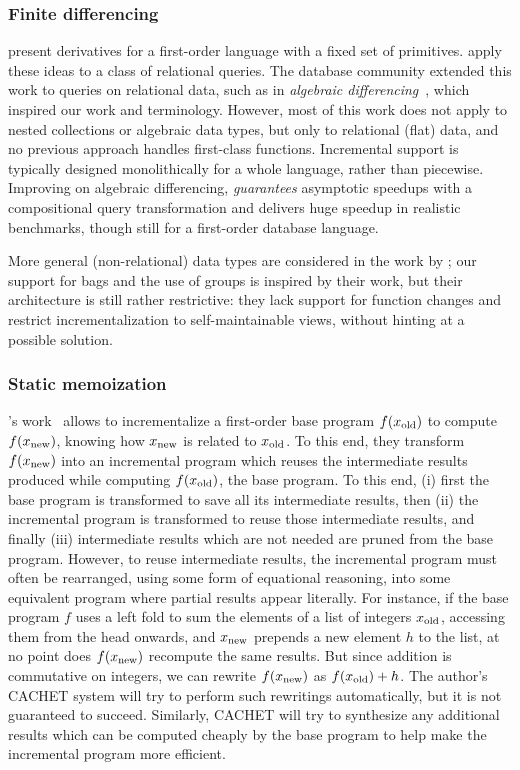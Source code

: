 \subsubsection{Finite differencing}
\label{sec:finite-diff}
\citet{Paige82FDC} present derivatives for a first-order language
with a fixed set of primitives.
\citet{Blakeley:1986:EUM} apply these ideas to a class of relational queries.
The database community extended
this work to queries on relational data, such as in \emph{algebraic
  differencing}~\citep{Gupta99MMV}, which inspired our work and
terminology. However, most of this work does not apply to nested
collections or algebraic data types, but only to relational
(flat) data, and no previous approach handles first-class
functions. Incremental support is typically designed
monolithically for a whole language, rather than piecewise.
Improving on algebraic differencing, \citet{Koch10IQE}
\emph{guarantees} asymptotic speedups with a compositional query
transformation and delivers huge speedup in realistic benchmarks,
though still for a first-order database language.

More general (non-relational) data types are considered in the work by \citet{GlucheGrust97Incr};
our support for bags and the use of groups is inspired by their work,
but their architecture is still rather restrictive: they lack
support for function changes and restrict incrementalization to
self-maintainable views, without hinting at a possible solution.

\subsubsection{Static memoization}
\label{ssec:staticmemo}
\citeauthor{Liu00}'s work~\citep{Liu00} allows to incrementalize a first-order base
program $f(x_{\textrm{old}})$ to compute $f(x_{\textrm{new}})$, knowing how
$x_{\textrm{new}}$ is related to $x_{\textrm{old}}$. To this end, they transform
$f(x_{\textrm{new}})$ into an incremental program which reuses the
intermediate results produced while computing $f(x_{\textrm{old}})$, the
base program. To this end, (i) first the base program is
transformed to save all its intermediate results, then (ii) the
incremental program is transformed to reuse those intermediate
results, and finally (iii) intermediate results which are not
needed are pruned from the base program. However, to reuse
intermediate results, the incremental program must often be
rearranged, using some form of equational reasoning, into some
equivalent program where partial results appear literally. For
instance, if the base program $f$ uses a left fold to sum the
elements of a list of integers $x_{\textrm{old}}$, accessing them from the
head onwards, and $x_{\textrm{new}}$ prepends a new element $h$ to the
list, at no point does $f(x_{\textrm{new}})$ recompute the same results.
But since addition is commutative on integers, we can rewrite
$f(x_{\textrm{new}})$ as $f(x_{\textrm{old}}) + h$. The author's CACHET system will
try to perform such rewritings automatically, but it is not
guaranteed to succeed. Similarly, CACHET will try to synthesize
any additional results which can be computed cheaply by the base
program to help make the incremental program more efficient.

